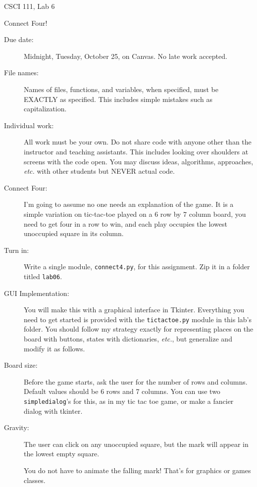 \documentclass[12pt]{article}
\begin{document}
\sloppy
\centerline{\Large CSCI 111, Lab 6}
\centerline{\large Connect Four!}

\begin{description}
\item[Due date:] Midnight, Tuesday, October 25, on Canvas.
No late work accepted.  

\item[File names:]  Names of files, functions, and variables, 
when specified,
must be EXACTLY as specified.  This includes simple mistakes such
as capitalization.

\item[Individual work:]  All work must be your own.  Do not share
code with anyone other than the instructor and teaching assistants.
This includes looking over shoulders at screens with the code open.
You may discuss ideas, algorithms, approaches, {\em etc.} with
other students but NEVER actual code.

\item[Connect Four:] I'm going to assume no one needs an explanation
of the game.  It is a simple variation on tic-tac-toe played on a 6 row by 
7 column board, you need to get four in a row to win, and each play
occupies the lowest unoccupied square in its column.

\item[Turn in:] Write a single module, \lstinline{connect4.py},
for this assignment.  Zip it in a folder titled \lstinline{lab06}.

\item[GUI Implementation:]  You will make this with a graphical
interface in Tkinter.  Everything you need to get started
is provided with the \lstinline{tictactoe.py} module 
in this lab's folder.  You should follow my strategy exactly for
representing places on the board with buttons, states with dictionaries,
{\em etc.}, but
generalize and modify it as follows.

\item[Board size:]  Before the game starts, ask the user for
the number of rows and columns.  Default values should be 6 rows
and 7 columns.  You can use two \lstinline{simpledialog}'s for this,
as in my tic tac toe game, or make a fancier dialog with tkinter.

\item[Gravity:] The user can click on any unoccupied square, but
the mark will appear in the lowest empty square.

You do not have to animate the falling mark!  That's for graphics
or games classes.


\end{description}
\end{document}
